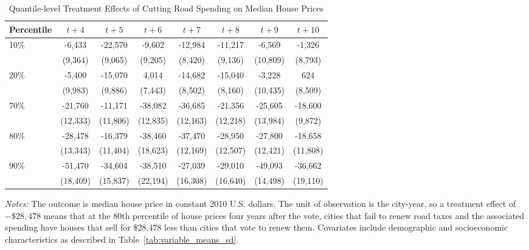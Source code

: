 \begin{table}[ht]
    \centering
    \caption{Quantile-level Treatment Effects of Cutting Road Spending on Median House Prices}
    \label{tab:quantile_tes}
    \begin{threeparttable}
    \begin{minipage}{\linewidth}
    \centering
    \begin{tabular}{p{1.5cm}ccccccc}
        \hline
        Percentile & $t + 4$ & $t + 5$ & $t + 6$ & $t + 7$ & $t + 8$ & $t + 9$ & $t + 10$ \\
        \hline
        10\% & -6,433 & -22,570 & -9,602 & -12,984 & -11,217 & -6,569 & -1,326 \\
             & (9,364) & (9,065) & (9,205) & (8,420) & (9,136) & (10,809) & (8,793) \\
        20\% & -5,400 & -15,070 & 4,014 & -14,682 & -15,040 & -3,228 & 624 \\
             & (9,983) & (9,886) & (7,443) & (8,502) & (8,160) & (10,435) & (8,509) \\
        70\% & -21,760 & -11,171 & -38,082 & -36,685 & -21,356 & -25,605 & -18,600 \\
             & (12,333) & (11,806) & (12,835) & (12,163) & (12,218) & (13,984) & (9,872) \\
        80\% & -28,478 & -16,379 & -38,460 & -37,470 & -28,950 & -27,800 & -18,658 \\
             & (13,343) & (11,404) & (18,623) & (12,169) & (12,507) & (12,421) & (11,808) \\
        90\% & -51,470 & -34,604 & -38,510 & -27,039 & -29,010 & -49,093 & -36,662 \\
             & (18,409) & (15,837) & (22,194) & (16,308) & (16,640) & (14,498) & (19,110) \\
        \hline
    \end{tabular}
    \vspace{0.5em}
    \begin{tablenotes}[flushleft]
        \small
        \item \textit{Notes:} The outcome is median house price in constant 2010 U.S. dollars. The unit of observation is the city-year, so a treatment effect of \(-\$28{,}478\) means that at the 80th percentile of house prices four years after the vote, cities that fail to renew road taxes and the associated spending have houses that sell for \$28,478 less than cities that vote to renew them. Covariates include demographic and socioeconomic characteristics as described in Table~\ref{tab:variable_means_sd}.
    \end{tablenotes}
    \end{minipage}
    \end{threeparttable}
\end{table}


